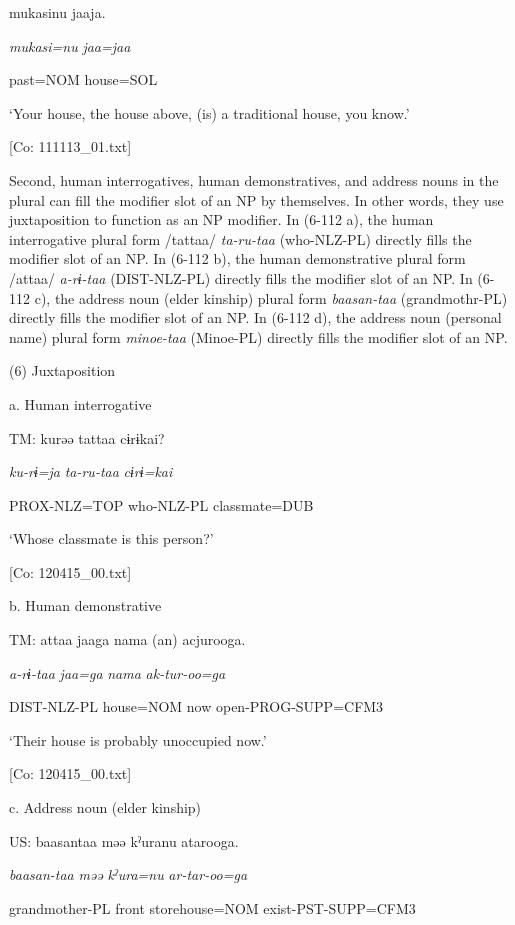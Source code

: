       mukasinu  jaaja.

      \textit{mukasi=nu}  \textit{jaa=jaa}

      past=NOM  house=SOL

      ‘Your house, the house above, (is) a traditional house, you know.’

      [Co: 111113\_01.txt]

  Second, human interrogatives, human demonstratives, and address nouns in the plural can fill the modifier slot of an NP by themselves. In other words, they use juxtaposition to function as an NP modifier. In (6-112 a), the human interrogative plural form /tattaa/ \textit{ta-ru-taa} (who-NLZ-PL) directly fills the modifier slot of an NP. In (6-112 b), the human demonstrative plural form /attaa/ \textit{a-rɨ-taa} (DIST-NLZ-PL) directly fills the modifier slot of an NP. In (6-112 c), the address noun (elder kinship) plural form \textit{baasan-taa} (grandmothr-PL) directly fills the modifier slot of an NP. In (6-112 d), the address noun (personal name) plural form \textit{minoe-taa} (Minoe-PL) directly fills the modifier slot of an NP.

(6)  Juxtaposition

  a.  Human interrogative

    TM:  kurəə  tattaa  cɨrɨkai?

      \textit{ku-rɨ=ja}  \textit{ta-ru-taa}  \textit{cɨrɨ=kai}

      PROX-NLZ=TOP  who-NLZ-PL  classmate=DUB

      ‘Whose classmate is this person?’

      [Co: 120415\_00.txt]

  b.  Human demonstrative

    TM:  attaa  jaaga  nama  (an)  acjurooga.

      \textit{a-rɨ-taa}  \textit{jaa=ga}  \textit{nama}    \textit{ak-tur-oo=ga}

      DIST-NLZ-PL  house=NOM  now    open-PROG-SUPP=CFM3

      ‘Their house is probably unoccupied now.’

      [Co: 120415\_00.txt]

  c.  Address noun (elder kinship)

    US:  baasantaa  məə  kˀuranu  atarooga.

      \textit{baasan-taa}  \textit{məə}  \textit{kˀura=nu}  \textit{ar-tar-oo=ga}

      grandmother-PL  front  storehouse=NOM  exist-PST-SUPP=CFM3

